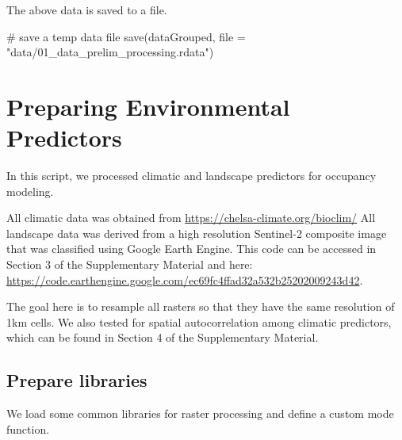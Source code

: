 \documentclass[]{article}
\newenvironment{Shaded}{}{}
\newcommand{\CommentTok}[1]{\textcolor[rgb]{0.00,0.50,0.00}{#1}}
\newcommand{\DataTypeTok}[1]{#1}
\newcommand{\KeywordTok}[1]{\textcolor[rgb]{0.00,0.00,1.00}{#1}}
\newcommand{\NormalTok}[1]{#1}
\newcommand{\StringTok}[1]{\textcolor[rgb]{0.00,0.50,0.50}{#1}}
\begin{document}
The above data is saved to a file.

\begin{Shaded}
\begin{Highlighting}[numbers=left,,]

\CommentTok{# save a temp data file}
\KeywordTok{save}\NormalTok{(dataGrouped, }\DataTypeTok{file =} \StringTok{"data/01_data_prelim_processing.rdata"}\NormalTok{)}
\end{Highlighting}
\end{Shaded}

\hypertarget{preparing-environmental-predictors}{%
\section{Preparing Environmental Predictors}\label{preparing-environmental-predictors}}

In this script, we processed climatic and landscape predictors for occupancy modeling.

All climatic data was obtained from \url{https://chelsa-climate.org/bioclim/}
All landscape data was derived from a high resolution Sentinel-2 composite image that was classified using Google Earth Engine. This code can be accessed in Section 3 of the Supplementary Material and here: \url{https://code.earthengine.google.com/ec69fc4ffad32a532b25202009243d42}.

The goal here is to resample all rasters so that they have the same resolution of 1km cells. We also tested for spatial autocorrelation among climatic predictors, which can be found in Section 4 of the Supplementary Material.

\hypertarget{prepare-libraries}{%
\subsection{Prepare libraries}\label{prepare-libraries}}

We load some common libraries for raster processing and define a custom mode function.
\end{document}
